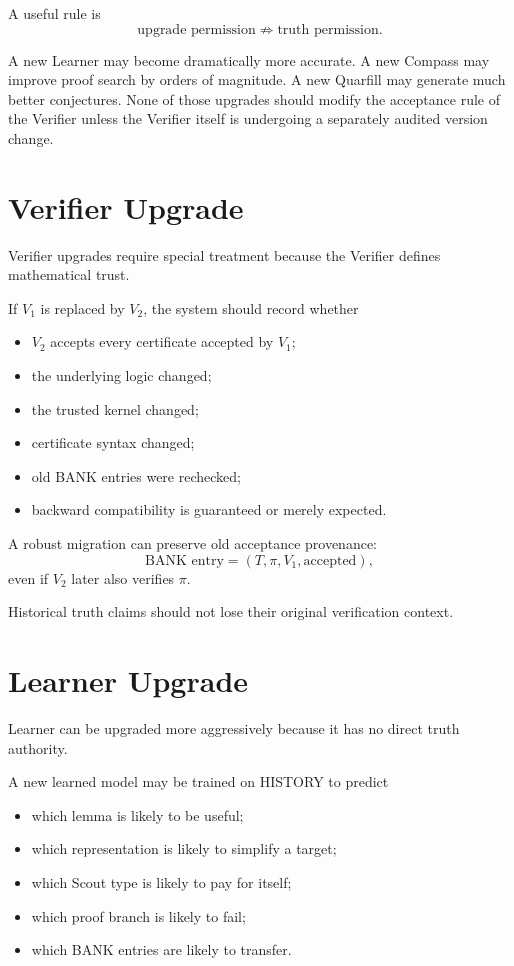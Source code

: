 \documentclass[11pt]{article}
\begin{document}
A useful rule is
\[
\text{upgrade permission} \not\Rightarrow \text{truth permission}.
\]

A new Learner may become dramatically more accurate. A new Compass may improve proof search by orders of magnitude. A new Quarfill may generate much better conjectures. None of those upgrades should modify the acceptance rule of the Verifier unless the Verifier itself is undergoing a separately audited version change.

\section{Verifier Upgrade}

Verifier upgrades require special treatment because the Verifier defines mathematical trust.

If $V_1$ is replaced by $V_2$, the system should record whether
\begin{itemize}
\item $V_2$ accepts every certificate accepted by $V_1$;
\item the underlying logic changed;
\item the trusted kernel changed;
\item certificate syntax changed;
\item old BANK entries were rechecked;
\item backward compatibility is guaranteed or merely expected.
\end{itemize}

A robust migration can preserve old acceptance provenance:
\[
\text{BANK entry} = (T,\pi,V_1,\text{accepted}),
\]
even if $V_2$ later also verifies $\pi$.

Historical truth claims should not lose their original verification context.

\section{Learner Upgrade}

Learner can be upgraded more aggressively because it has no direct truth authority.

A new learned model may be trained on HISTORY to predict
\begin{itemize}
\item which lemma is likely to be useful;
\item which representation is likely to simplify a target;
\item which Scout type is likely to pay for itself;
\item which proof branch is likely to fail;
\item which BANK entries are likely to transfer.
\end{itemize}
\end{document}
